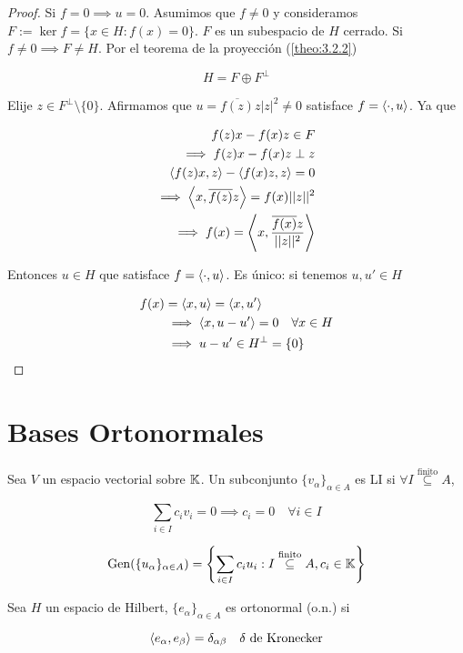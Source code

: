 \begin{proof}
    Si $f=0\implies u=0$. Asumimos que $f\neq 0$ y consideramos $F:=\ker f=\{x\in H:f(x)=0\}$. $F$ es un subespacio de $H$ cerrado. Si $f\neq 0\implies F\neq H$. Por el teorema de la proyección (\ref{theo:3.2.2})

    \[H=F\oplus F^\perp\]

    Elije $z\in F^\perp\setminus\{0\}$. Afirmamos que $u=\overline{f(z)}z|z|^2\neq 0$ satisface $f=\left\langle \cdot,u\right\rangle$. Ya que 

    \begin{align*}
        f(z)x-f(x)z\in F\\
        \implies f(z)x-f(x)z\perp z\\
        \left\langle f(z)x,z\right\rangle-\left\langle f(x)z,z\right\rangle=0\\
        \implies \left\langle x,\overline{f(z)}z\right\rangle=f(x)||z||^2\\
        \implies f(x)=\left\langle x,\frac{\overline{f(x)}z}{||z||^2}\right\rangle
    \end{align*}

    Entonces $u\in H$ que satisface $f=\left\langle \cdot,u\right\rangle$. Es único: si tenemos $u,u'\in H$ 

    \begin{align*}
        f(x)&=\left\langle x,u\right\rangle=\left\langle x,u'\right\rangle\\\
        &\implies \left\langle x,u-u'\right\rangle=0\quad \forall x\in H\\
        &\implies u-u'\in H^\perp=\{0\}
    \end{align*}
\end{proof}

\section{Bases Ortonormales}

Sea $V$ un espacio vectorial sobre $\mathbb{K}$. Un subconjunto $\{v_\alpha\}_{\alpha\in A}$ es LI si $\forall I\overset{\text{finito}}{\subseteq} A$, 

\[\sum_{i\in I}c_iv_i=0\implies c_i=0\quad \forall i\in I\]

\[\operatorname{Gen} (\{u_\alpha\}_{\alpha\in A})=\left\{\sum_{i\in I}c_iu_i:I\overset{\text{finito}}{\subseteq} A, c_i\in \mathbb{K}\right\}\]

\begin{fdefinition}
    Sea $H$ un espacio de Hilbert, $\{e_\alpha\}_{\alpha\in A}$ es ortonormal (o.n.) si 

    \[\left\langle e_\alpha,e_\beta\right\rangle=\delta_{\alpha\beta}\quad \text{$\delta$ de Kronecker}\]
\end{fdefinition}

